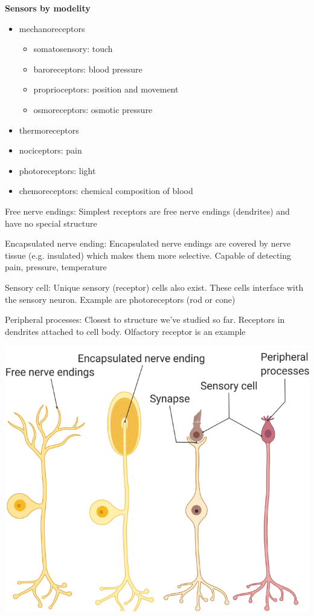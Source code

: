 \documentclass[11pt,fleqn]{book} %
\begin{document}
\textbf{Sensors by modelity}
\begin{itemize}
    \item mechanoreceptors
    \begin{itemize}
        \item somatosensory: touch
        \item baroreceptors: blood pressure
        \item proprioceptors: position and movement
        \item osmoreceptors: osmotic pressure
    \end{itemize}
    \item thermoreceptors
    \item nociceptors: pain
    \item photoreceptors: light
    \item chemoreceptors: chemical composition of blood
\end{itemize}
\begin{descriptions}
    \item[Free nerve endings:] Simplest receptors are free nerve endings (dendrites) and have no special structure
    \item[Encapsulated nerve ending:] Encapsulated nerve endings are covered by nerve tissue (e.g. insulated) which makes them more selective. Capable of detecting pain, pressure, temperature
    \item[Sensory cell:] Unique sensory (receptor) cells also exist. These cells interface with the sensory neuron. Example are photoreceptors (rod or cone) 
    \item[Peripheral processes:] Closest to structure we’ve studied so far. Receptors in dendrites attached to cell body. Olfactory receptor is an example 
\end{descriptions}
\begin{center}
    \includegraphics[width=0.65\linewidth]{Pictures/Screenshot 2024-03-06 193746.png}
\end{center}
\end{document}
